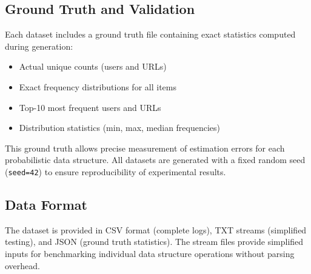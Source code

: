 \subsection{Ground Truth and Validation}

Each dataset includes a ground truth file containing exact statistics computed during generation:

\begin{itemize}
    \item Actual unique counts (users and URLs)
    \item Exact frequency distributions for all items
    \item Top-10 most frequent users and URLs
    \item Distribution statistics (min, max, median frequencies)
\end{itemize}

This ground truth allows precise measurement of estimation errors for each probabilistic data structure. All datasets are generated with a fixed random seed (\texttt{seed=42}) to ensure reproducibility of experimental results.

\subsection{Data Format}

The dataset is provided in CSV format (complete logs), TXT streams (simplified testing), and JSON (ground truth statistics). The stream files provide simplified inputs for benchmarking individual data structure operations without parsing overhead.
